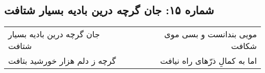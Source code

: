 \begin{center}
\section*{شماره ۱۵: جان گرچه درین بادیه بسیار شتافت}
\label{sec:015}
\begin{longtable}{l p{0.5cm} r}
جان گرچه درین بادیه بسیار شتافت
&&
مویی بندانست و بسی موی شکافت
\\
گرچه ز دلم هزار خورشید بتافت
&&
اما به کمالِ ذرّهای راه نیافت
\\
\end{longtable}
\end{center}
